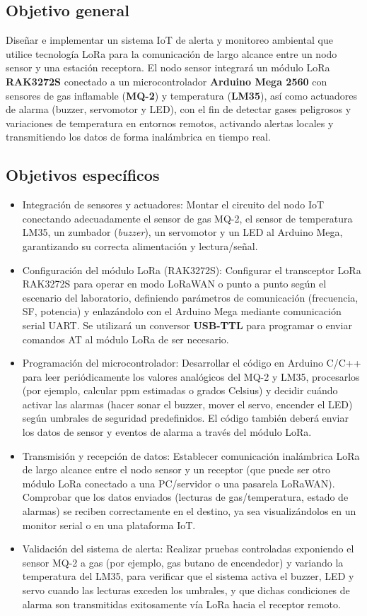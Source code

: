 \subsection*{Objetivo general}
Diseñar e implementar un sistema IoT de alerta y monitoreo ambiental que utilice tecnología LoRa para la comunicación de largo alcance entre un nodo sensor y una estación receptora. El nodo sensor integrará un módulo LoRa \textbf{RAK3272S} conectado a un microcontrolador \textbf{Arduino Mega 2560} con sensores de gas inflamable (\textbf{MQ-2}) y temperatura (\textbf{LM35}), así como actuadores de alarma (buzzer, servomotor y LED), con el fin de detectar gases peligrosos y variaciones de temperatura en entornos remotos, activando alertas locales y transmitiendo los datos de forma inalámbrica en tiempo real.

\subsection*{Objetivos específicos}
\begin{itemize}
\item Integración de sensores y actuadores: Montar el circuito del nodo IoT conectando adecuadamente el sensor de gas MQ-2, el sensor de temperatura LM35, un zumbador (\textit{buzzer}), un servomotor y un LED al Arduino Mega, garantizando su correcta alimentación y lectura/señal.
\item Configuración del módulo LoRa (RAK3272S): Configurar el transceptor LoRa RAK3272S para operar en modo LoRaWAN o punto a punto según el escenario del laboratorio, definiendo parámetros de comunicación (frecuencia, SF, potencia) y enlazándolo con el Arduino Mega mediante comunicación serial UART. Se utilizará un conversor \textbf{USB-TTL} para programar o enviar comandos AT al módulo LoRa de ser necesario.
\item Programación del microcontrolador: Desarrollar el código en Arduino C/C++ para leer periódicamente los valores analógicos del MQ-2 y LM35, procesarlos (por ejemplo, calcular ppm estimadas o grados Celsius) y decidir cuándo activar las alarmas (hacer sonar el buzzer, mover el servo, encender el LED) según umbrales de seguridad predefinidos. El código también deberá enviar los datos de sensor y eventos de alarma a través del módulo LoRa.
\item Transmisión y recepción de datos: Establecer comunicación inalámbrica LoRa de largo alcance entre el nodo sensor y un receptor (que puede ser otro módulo LoRa conectado a una PC/servidor o una pasarela LoRaWAN). Comprobar que los datos enviados (lecturas de gas/temperatura, estado de alarmas) se reciben correctamente en el destino, ya sea visualizándolos en un monitor serial o en una plataforma IoT.
\item Validación del sistema de alerta: Realizar pruebas controladas exponiendo el sensor MQ-2 a gas (por ejemplo, gas butano de encendedor) y variando la temperatura del LM35, para verificar que el sistema activa el buzzer, LED y servo cuando las lecturas exceden los umbrales, y que dichas condiciones de alarma son transmitidas exitosamente vía LoRa hacia el receptor remoto.
\end{itemize}


